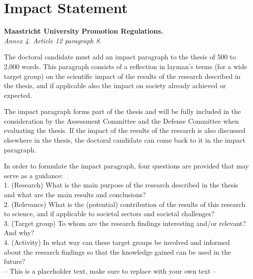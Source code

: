 
\chapter*{Impact Statement}

\noindent

\textbf{Maastricht University Promotion Regulations.} \\
\textit{Annex 4. Article 12 paragraph 8.}

\vspace{1em}
The doctoral candidate must add an impact paragraph to the thesis of 500 to 2,000 words. This paragraph consists of a reflection in layman's terms (for a wide target group) on the scientific impact of the results of the research described in the thesis, and if applicable also the impact on society already achieved or expected.

\vspace{1em}
The impact paragraph forms part of the thesis and will be fully included in the consideration by the Assessment Committee and the Defense Committee when evaluating the thesis. If the impact of the results of the research is also discussed elsewhere in the thesis, the doctoral candidate can come back to it in the impact paragraph.

\vspace{1em}
In order to formulate the impact paragraph, four questions are provided that may serve as a guidance: \\

\vspace{1em}
1. (Research) What is the main purpose of the research described in the  thesis and what are the main results and conclusions? \\
2. (Relevance) What is the (potential) contribution of the results of this research to science, and if applicable to societal sectors and societal challenges? \\
3. (Target group) To whom are the research findings interesting and/or relevant? And why? \\
4. (Activity) In what way can these target groups be involved and informed about the research findings so that the knowledge gained can be used in the future? \\

\vspace{1em}
-- This is a placeholder text, make sure to replace with your own text --